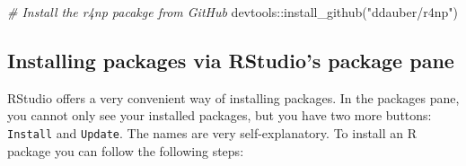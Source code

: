 \documentclass[
]{book}
\newenvironment{Shaded}{\begin{snugshade}}{\end{snugshade}}
\newcommand{\CommentTok}[1]{\textcolor[rgb]{0.56,0.35,0.01}{\textit{#1}}}
\newcommand{\FunctionTok}[1]{\textcolor[rgb]{0.00,0.00,0.00}{#1}}
\newcommand{\NormalTok}[1]{#1}
\newcommand{\SpecialCharTok}[1]{\textcolor[rgb]{0.00,0.00,0.00}{#1}}
\newcommand{\StringTok}[1]{\textcolor[rgb]{0.31,0.60,0.02}{#1}}
\begin{document}
\begin{Shaded}
\begin{Highlighting}[]
\CommentTok{\# Install the \textquotesingle{}r4np\textquotesingle{} pacakge from GitHub}
\NormalTok{devtools}\SpecialCharTok{::}\FunctionTok{install\_github}\NormalTok{(}\StringTok{"ddauber/r4np"}\NormalTok{)}
\end{Highlighting}
\end{Shaded}

\hypertarget{installing-packages-via-rstudio}{%
\subsection{Installing packages via RStudio's package pane}\label{installing-packages-via-rstudio}}

RStudio offers a very convenient way of installing packages. In the packages pane, you cannot only see your installed packages, but you have two more buttons: \texttt{Install} and \texttt{Update}. The names are very self-explanatory. To install an R package you can follow the following steps:
\end{document}

